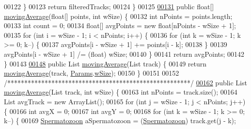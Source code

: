 \begin{DoxyCode}
00122     \}
00123     \textcolor{keywordflow}{return} filteredTracks;
00124   \}
00125 
\hypertarget{_signal_processing_8java_source_l00131}{}\hyperlink{classfunctions_1_1_signal_processing_a4f10245c50d850b87d1ef4d81c28300d}{00131}   \textcolor{keyword}{public} \textcolor{keywordtype}{float}[] \hyperlink{classfunctions_1_1_signal_processing_a4f10245c50d850b87d1ef4d81c28300d}{movingAverage}(\textcolor{keywordtype}{float}[] points, \textcolor{keywordtype}{int} wSize) \{
00132     \textcolor{keywordtype}{int} nPoints = points.length;
00133     \textcolor{keywordtype}{int} count = 0;
00134     \textcolor{keywordtype}{float}[] avgPoints = \textcolor{keyword}{new} \textcolor{keywordtype}{float}[nPoints - wSize + 1];
00135     \textcolor{keywordflow}{for} (\textcolor{keywordtype}{int} i = wSize - 1; i < nPoints; i++) \{
00136       \textcolor{keywordflow}{for} (\textcolor{keywordtype}{int} k = wSize - 1; k >= 0; k--) \{
00137         avgPoints[i - wSize + 1] += points[i - k];
00138       \}
00139       avgPoints[i - wSize + 1] /= (float) wSize;
00140     \}
00141     \textcolor{keywordflow}{return} avgPoints;
00142   \}
00143 
\hypertarget{_signal_processing_8java_source_l00148}{}\hyperlink{classfunctions_1_1_signal_processing_a9f9e525d2a03a62026159736e71a2343}{00148}   \textcolor{keyword}{public} List \hyperlink{classfunctions_1_1_signal_processing_a9f9e525d2a03a62026159736e71a2343}{movingAverage}(List track) \{
00149     \textcolor{keywordflow}{return} \hyperlink{classfunctions_1_1_signal_processing_a4f10245c50d850b87d1ef4d81c28300d}{movingAverage}(track, \hyperlink{classdata_1_1_params}{Params}.\hyperlink{classdata_1_1_params_ad1b7844e5f66ee81c3de06d1a8ca645e}{wSize});
00150   \}
00151 
00152   \textcolor{comment}{/******************************************************/}
\hypertarget{_signal_processing_8java_source_l00162}{}\hyperlink{classfunctions_1_1_signal_processing_a9dbd7166c87ffab7dc6d7f7435e89f95}{00162}   \textcolor{keyword}{public} List \hyperlink{classfunctions_1_1_signal_processing_a9dbd7166c87ffab7dc6d7f7435e89f95}{movingAverage}(List track, \textcolor{keywordtype}{int} wSize) \{
00163     \textcolor{keywordtype}{int} nPoints = track.size();
00164     List avgTrack = \textcolor{keyword}{new} ArrayList();
00165     \textcolor{keywordflow}{for} (\textcolor{keywordtype}{int} j = wSize - 1; j < nPoints; j++) \{
00166       \textcolor{keywordtype}{int} avgX = 0;
00167       \textcolor{keywordtype}{int} avgY = 0;
00168       \textcolor{keywordflow}{for} (\textcolor{keywordtype}{int} k = wSize - 1; k >= 0; k--) \{
00169         \hyperlink{classdata_1_1_spermatozoon}{Spermatozoon} aSpermatozoon = (\hyperlink{classdata_1_1_spermatozoon}{Spermatozoon}) track.get(j - k);

\end{DoxyCode}
